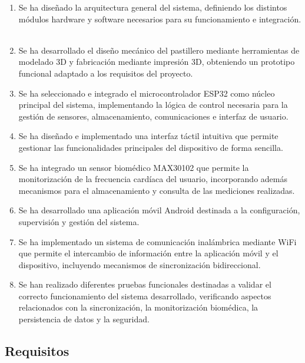 \begin{enumerate}

\item Se ha diseñado la arquitectura general del sistema, definiendo los distintos módulos hardware y software necesarios para su funcionamiento e integración.\\

\

\item Se ha desarrollado el diseño mecánico del pastillero mediante herramientas de modelado 3D y fabricación mediante impresión 3D, obteniendo un prototipo funcional adaptado a los requisitos del proyecto.

\item Se ha seleccionado e integrado el microcontrolador ESP32 como núcleo principal del sistema, implementando la lógica de control necesaria para la gestión de sensores, almacenamiento, comunicaciones e interfaz de usuario.

\item Se ha diseñado e implementado una interfaz táctil intuitiva que permite gestionar las funcionalidades principales del dispositivo de forma sencilla.

\item Se ha integrado un sensor biomédico MAX30102 que permite la monitorización de la frecuencia cardíaca del usuario, incorporando además mecanismos para el almacenamiento y consulta de las mediciones realizadas.

\item Se ha desarrollado una aplicación móvil Android destinada a la configuración, supervisión y gestión del sistema.

\item Se ha implementado un sistema de comunicación inalámbrica mediante WiFi que permite el intercambio de información entre la aplicación móvil y el dispositivo, incluyendo mecanismos de sincronización bidireccional.

\item Se han realizado diferentes pruebas funcionales destinadas a validar el correcto funcionamiento del sistema desarrollado, verificando aspectos relacionados con la sincronización, la monitorización biomédica, la persistencia de datos y la seguridad.

\end{enumerate}

\subsection{Requisitos}

